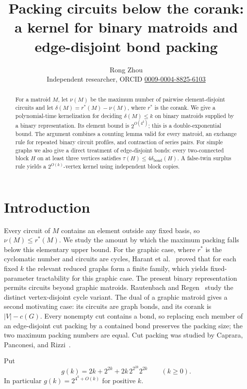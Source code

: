 \documentclass[11pt]{article}
\title{Packing circuits below the corank: a kernel for binary matroids and edge-disjoint bond packing}
\author{Rong Zhou\\ \small Independent researcher, ORCID \href{https://orcid.org/0009-0004-8825-6103}{0009-0004-8825-6103}}
\date{}
\newcommand{\bond}{\operatorname{bond}}
\begin{document}
\maketitle

\begin{abstract}
For a matroid $M$, let $\nu(M)$ be the maximum number of pairwise
element-disjoint circuits and let $\delta(M)=r^*(M)-\nu(M)$, where $r^*$ is
the corank.  We give a polynomial-time kernelization for deciding
$\delta(M)\leq k$ on binary matroids supplied by a binary representation.
Its element bound is $2^{O(4^k)}$; this is a double-exponential bound.
The argument combines a counting lemma valid for every matroid, an
exchange rule for repeated binary circuit profiles, and contraction of
series pairs.  For simple graphs we also give a direct treatment of
edge-disjoint bonds: every two-connected block $H$ on at least three
vertices satisfies $\tau(H)\leq4\delta_{\bond}(H)$.  A false-twin
surplus rule yields a $2^{O(k)}$-vertex kernel using independent block
copies.
\end{abstract}

\section{Introduction}
Every circuit of $M$ contains an element outside any fixed basis, so
$\nu(M)\leq r^*(M)$.  We study the amount by which the maximum packing
falls below this elementary upper bound.  For the graphic case, where
$r^*$ is the cyclomatic number and circuits are cycles,
Harant et al.~\citep[Theorem~3]{Harant2010} proved that for each fixed
$k$ the relevant reduced graphs form a finite family, which yields
fixed-parameter tractability for this graphic case.  The present binary
representation permits circuits beyond graphic matroids.
Rautenbach and Regen~\citep{RautenbachRegen2012} study the distinct
vertex-disjoint cycle variant.  The dual of a graphic matroid gives a
second motivating case: its circuits are graph bonds, and its corank is
$|V|-c(G)$.  Every nonempty cut contains a bond, so replacing each
member of an edge-disjoint cut packing by a contained bond preserves
the packing size; the two maximum packing numbers are equal.  Cut
packing was studied by Caprara, Panconesi, and Rizzi~\citep{Caprara2004}.

Put
\begin{equation}\label{eq:g}
 g(k)=2k+2^{2k}+2k\,2^{2^{2k}}2^{2k}\qquad(k\geq0).
\end{equation}
In particular $g(k)=2^{4^k+O(k)}$ for positive $k$.
\end{document}
